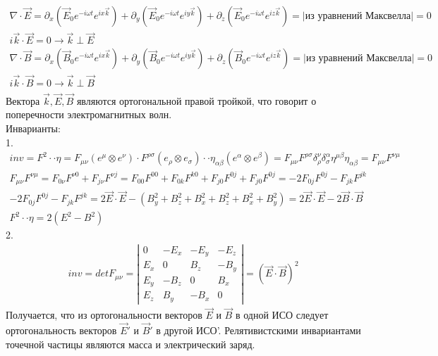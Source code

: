 \begin{gather*}
\nabla \cdot \vec E = \partial_x \left(\vec E_0 e^{-i\omega t} e^{ix\vec k} \right) +  \partial_y \left(\vec E_0 e^{-i\omega t} e^{iy\vec k} \right) +  \partial_z \left(\vec E_0 e^{-i\omega t} e^{iz\vec k} \right) = \left|\text{из уравнений Максвелла}\right| = 0\\
i\vec k \cdot \vec E = 0 \rightarrow \vec k \perp \vec E\\
\nabla \cdot \vec B = \partial_x \left(\vec B_0 e^{-i\omega t} e^{ix\vec k} \right) +  \partial_y \left(\vec B_0 e^{-i\omega t} e^{iy\vec k} \right) +  \partial_z \left(\vec B_0 e^{-i\omega t} e^{iz\vec k} \right) = \left|\text{из уравнений Максвелла}\right| = 0\\
i\vec k \cdot \vec B = 0 \rightarrow \vec k \perp \vec B\\
\end{gather*}
Вектора $\vec k, \vec E, \vec B$ являются ортогональной правой тройкой, что говорит о поперечности электромагнитных волн.\\
Инварианты:\\
1.
\begin{gather*}
inv = F^2\cdot \cdot \eta = F_{\mu\nu} (e^\mu \otimes e^\nu) \cdot F^{\rho \sigma} (e_\rho \otimes e_\sigma) \cdot \cdot \eta_{\alpha\beta} (e^\alpha \otimes e^\beta) = F_{\mu\nu}F^{\rho\sigma}\delta^\nu_\rho \delta^\alpha_\sigma \eta^{\mu\beta}\eta_{\alpha\beta} = F_{\mu\nu}F^{\nu\mu} \\
F_{\mu\nu}F^{\nu\mu} = F_{0\nu}F^{\nu 0} + F_{j\nu}F^{\nu j} = F_{00}F^{00} + F_{0k}F^{k0} + F_{j0}F^{0j} + F_{j0}F^{0j} = -2F_{0j}F^{0j} - F_{jk}F^{jk}\\
-2F_{0j}F^{0j} - F_{jk}F^{jk} = 2 \vec E \cdot \vec E - \left(B^2_y + B^2_z + B^2_x + B^2_z + B^2_x + B^2_y\right) = 2\vec E \cdot \vec E - 2 \vec B \cdot \vec B\\
F^2 \cdot \cdot \eta = 2\left(E^2 - B^2\right) 
\end{gather*}
2. 
\begin {gather*}
inv = det F_{\mu\nu} = \left|\begin{matrix}0 & -E_x & -E_y & -E_z\\ E_x & 0 & B_z & -B_y \\ E_y & -B_z & 0 & B_x \\ E_z & B_y & -B_x & 0 \end{matrix}\right| = \left(\vec E \cdot \vec B\right)^2
\end{gather*}
Получается, что из ортогональности векторов $\vec E$ и $\vec B$ в одной ИСО следует ортогональность векторов $\vec E'$ и $\vec B'$ в другой ИСО'. 
Релятивистскими инвариантами точечной частицы являются масса и электрический заряд. 
 
